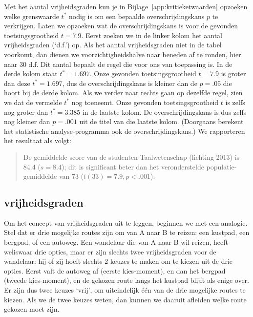 \documentclass[
]{book}
\begin{document}
Met het aantal vrijheidsgraden kun je in
Bijlage~\ref{app:kritieketwaarden} opzoeken welke grenswaarde \(t^*\) nodig
is om een bepaalde overschrijdingskans \(p\) te verkrijgen. Laten we
opzoeken wat de overschrijdingskans is voor de gevonden
toetsingsgrootheid \(t=7.9\). Eerst zoeken we in de linker kolom het
aantal vrijheidsgraden (`d.f.') op. Als het aantal vrijheidsgraden niet
in de tabel voorkomt, dan dienen we voorzichtigheidshalve naar beneden
af te ronden, hier naar 30 d.f. Dit aantal bepaalt de regel die voor ons
van toepassing is. In de derde kolom staat \(t^*=1.697\). Onze gevonden
toetsingsgrootheid \(t=7.9\) is groter dan deze \(t^*=1.697\), dus de
overschrijdingskans is kleiner dan de \(p=.05\) die hoort bij de derde
kolom. Als we verder naar rechts gaan op dezelfde regel, zien we dat de
vermelde \(t^*\) nog toeneemt. Onze gevonden toetsingsgrootheid \(t\) is
zelfs nog groter dan \(t^*=3.385\) in de laatste kolom. De
overschrijdingskans is dus zelfs nog kleiner dan \(p=.001\) uit de titel
van die laatste kolom. (Doorgaans berekent het statistische
analyse-programma ook de overschrijdingskans.) We rapporteren het
resultaat als volgt:

\begin{quote}
De gemiddelde score van de studenten Taalwetenschap (lichting 2013) is
84.4 (\(s=8.4\)); dit is significant beter dan het veronderstelde
populatie-gemiddelde van 73 (\(t(33)=7.9, p<.001\)).
\end{quote}

\hypertarget{sec:ttoets-vrijheidsgraden}{%
\subsection{vrijheidsgraden}\label{sec:ttoets-vrijheidsgraden}}

Om het concept van vrijheidsgraden uit te leggen, beginnen we met een
analogie. Stel dat er drie mogelijke routes zijn om van A naar B te
reizen: een kustpad, een bergpad, of een autoweg. Een wandelaar die van
A naar B wil reizen, heeft weliswaar drie opties, maar er zijn slechts
twee vrijheidsgraden voor de wandelaar: hij of zij hoeft slechts 2
keuzes te maken om te kiezen uit de drie opties. Eerst valt de autoweg
af (eerste kies-moment), en dan het bergpad (tweede kies-moment), en de
gekozen route langs het kustpad blijft als enige over. Er zijn dus twee
keuzes `vrij', om uiteindelijk één van de drie mogelijke routes te
kiezen. Als we de twee keuzes weten, dan kunnen we daaruit afleiden
welke route gekozen moet zijn.
\end{document}
